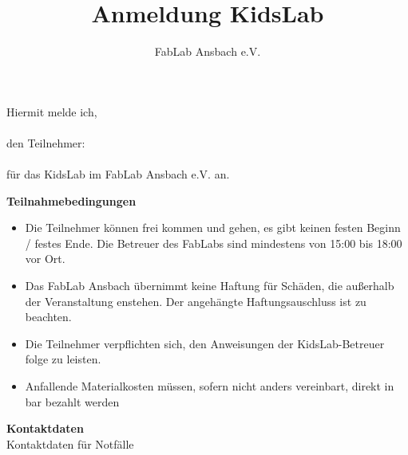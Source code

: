 \title{Anmeldung KidsLab}
\author{FabLab Ansbach e.V.}


	
\usepackage{enumitem}


\setlength{\parindent}{0pt} %
	
\begin{Form}
	\renewcommand{\baselinestretch}{1.3}\selectfont
	\setlength{\parskip}{0.8em}
	
	Hiermit melde ich, \\
		\hfill {} \\
		den Teilnehmer: \\
    \hfill {}	\hfill {}
    \hfill {}
    \hfill {} \\
    für das KidsLab im FabLab Ansbach e.V. an. \hfill\par
	\vspace{0.5ex}
	{\Large\textbf{Teilnahmebedingungen}}
	\begin{itemize}[itemsep=0pt, topsep=0pt]
		\item Die Teilnehmer können frei kommen und gehen, es gibt keinen festen Beginn / festes Ende. Die Betreuer des FabLabs sind mindestens von 15:00 bis 18:00 vor Ort.
		\item Das FabLab Ansbach übernimmt keine Haftung für Schäden, die außerhalb der Veranstaltung enstehen. Der angehängte Haftungsauschluss ist zu beachten.
		\item Die Teilnehmer verpflichten sich, den Anweisungen der KidsLab-Betreuer folge zu leisten.
		\item Anfallende Materialkosten müssen, sofern nicht anders vereinbart, direkt in bar bezahlt werden
	\end{itemize}
	\vspace{0.8em}
	{\Large\textbf{Kontaktdaten}}\\
	Kontaktdaten für Notfälle\\
	 	 \\

\end{Form}

